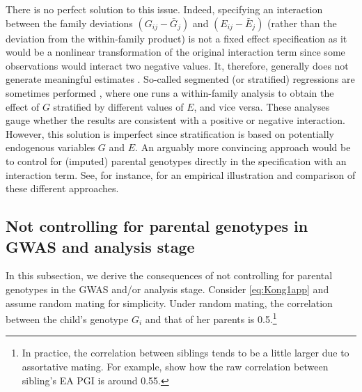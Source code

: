 \documentclass[12pt,a4paper]{article}
\begin{document}
\begin{bibunit}
There is no perfect solution to this issue. Indeed, specifying an interaction between the family deviations $\left(G_{ij}-\bar{G}_j\right)$ and $\left(E_{ij}-\bar{E}_j\right)$ (rather than the deviation from the within-family product) is not a fixed effect specification as it would be a nonlinear transformation of the original interaction term since some observations would interact two negative values. It, therefore, generally does not generate meaningful estimates \citep{shaver2019interpreting}. So-called segmented (or stratified) regressions are sometimes performed \citep{shaver2019interpreting}, where one runs a within-family analysis to obtain the effect of $G$ stratified by different values of $E$, and vice versa. These analyses gauge whether the results are consistent with a positive or negative interaction. However, this solution is imperfect since stratification is based on potentially endogenous variables $G$ and $E$. An arguably more convincing approach would be to control for (imputed) parental genotypes directly in the specification with an interaction term. See, for instance, \cite{Muslimova2020b} for an empirical illustration and comparison of these different approaches.

\subsection{Not controlling for parental genotypes in GWAS and analysis stage} \label{appsec:underestimation}
In this subsection, we derive the consequences of not controlling for parental genotypes in the GWAS and/or analysis stage. Consider \autoref{eq:Kong1app} and assume random mating for simplicity. Under random mating, the correlation between the child's genotype $G_i$ and that of her parents is 0.5.\footnote{In practice, the correlation between siblings tends to be a little larger due to assortative mating. For example, \citet{torvik2022modeling} show how the raw correlation between sibling's EA PGI is around 0.55.} 


\end{bibunit}
\end{document}
